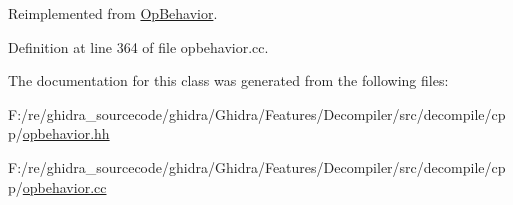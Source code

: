 Reimplemented from \mbox{\hyperlink{class_op_behavior_aeeed3af7aa35264b31a1f182884214a9}{Op\+Behavior}}.



Definition at line 364 of file opbehavior.\+cc.



The documentation for this class was generated from the following files\+:\begin{DoxyCompactItemize}
\item 
F\+:/re/ghidra\+\_\+sourcecode/ghidra/\+Ghidra/\+Features/\+Decompiler/src/decompile/cpp/\mbox{\hyperlink{opbehavior_8hh}{opbehavior.\+hh}}\item 
F\+:/re/ghidra\+\_\+sourcecode/ghidra/\+Ghidra/\+Features/\+Decompiler/src/decompile/cpp/\mbox{\hyperlink{opbehavior_8cc}{opbehavior.\+cc}}\end{DoxyCompactItemize}
